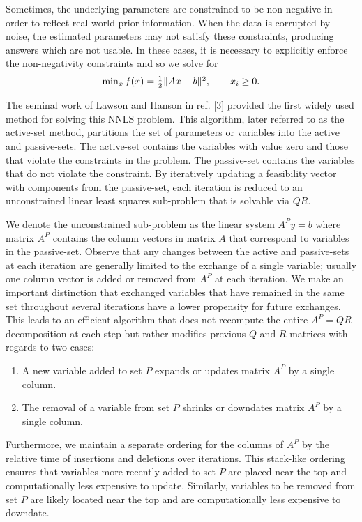 \documentclass{report}
\begin{document}
Sometimes, the underlying parameters are constrained to be non-negative
in order to reflect real-world prior information. When the data is
corrupted by noise, the estimated parameters may not satisfy these
constraints, producing answers which are not usable. In these cases, it
is necessary to explicitly enforce the non-negativity constraints and so
we solve for
$$
\begin{array}{c}
\min_xf(x)=\frac{1}{2}\|Ax-b\|^2,\qquad x_i\geq 0.
\end{array}\nonumber 
$$

The seminal work of Lawson and Hanson in ref. [3] provided the first
widely used method for solving this NNLS problem. This algorithm, later
referred to as the active-set method, partitions the set of parameters or
variables into the active and passive-sets. The active-set contains the
variables with value zero and those that violate the constraints in the
problem. The passive-set contains the variables that do not violate the
constraint. By iteratively updating a feasibility vector with components
from the passive-set, each iteration is reduced to an unconstrained
linear least squares sub-problem that is solvable via $QR$.

We denote the unconstrained sub-problem as the linear system $A^Py=b$
where matrix $A^P$ contains the column vectors in matrix $A$ that
correspond to variables in the passive-set. Observe that any changes
between the active and passive-sets at each iteration are generally
limited to the exchange of a single variable; usually one column vector
is added or removed from $A^P$ at each iteration. We make an important
distinction that exchanged variables that have remained in the same set
throughout several iterations have a lower propensity for future
exchanges. This leads to an efficient algorithm that does not recompute
the entire $A^P=QR$ decomposition at each step but rather modifies
previous $Q$ and $R$ matrices with regards to two cases:
\begin{enumerate}
\item A new variable added to set $P$ expands or updates matrix $A^P$ by a single column.
\item The removal of a variable from set $P$ shrinks or downdates matrix
$A^P$ by a single column.
\end{enumerate}
Furthermore, we maintain a separate ordering for the columns of $A^P$ by
the relative time of insertions and deletions over iterations. This
stack-like ordering ensures that variables more recently added to set $P$
are placed near the top and computationally less expensive to update.
Similarly, variables to be removed from set $P$ are likely located near
the top and are computationally less expensive to downdate.
\end{document}
